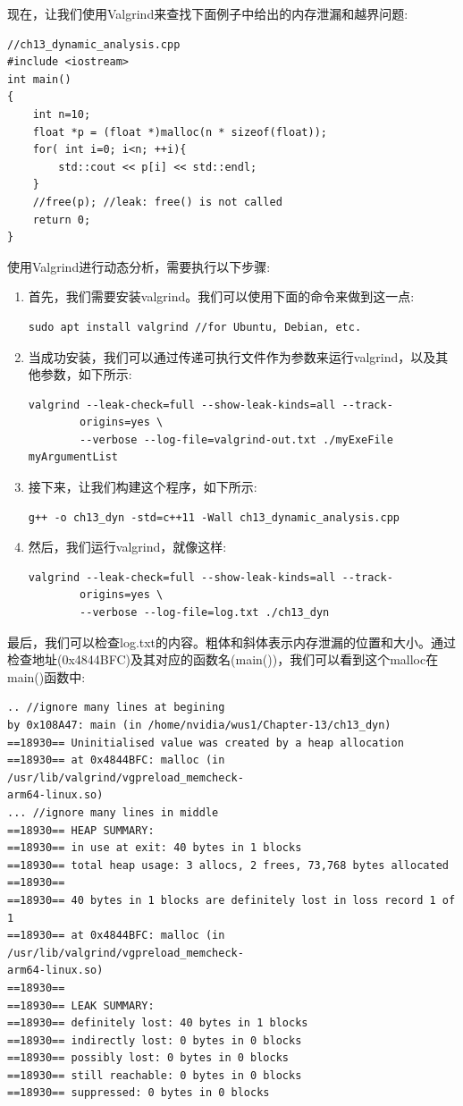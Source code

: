 现在，让我们使用Valgrind来查找下面例子中给出的内存泄漏和越界问题: \par

\begin{lstlisting}[caption={}]
//ch13_dynamic_analysis.cpp
#include <iostream>
int main()
{
	int n=10;
	float *p = (float *)malloc(n * sizeof(float));
	for( int i=0; i<n; ++i){
		std::cout << p[i] << std::endl;
	}
	//free(p); //leak: free() is not called
	return 0;
}
\end{lstlisting}

使用Valgrind进行动态分析，需要执行以下步骤:
\begin{enumerate}
	\item 首先，我们需要安装valgrind。我们可以使用下面的命令来做到这一点:
	\begin{lstlisting}[caption={}]
		sudo apt install valgrind //for Ubuntu, Debian, etc.
	\end{lstlisting}
	\item 当成功安装，我们可以通过传递可执行文件作为参数来运行valgrind，以及其他参数，如下所示:
	\begin{lstlisting}[caption={}]
		valgrind --leak-check=full --show-leak-kinds=all --track-
		origins=yes \
		--verbose --log-file=valgrind-out.txt ./myExeFile myArgumentList
	\end{lstlisting}
	\item 接下来，让我们构建这个程序，如下所示:
	\begin{lstlisting}[caption={}]
		g++ -o ch13_dyn -std=c++11 -Wall ch13_dynamic_analysis.cpp
	\end{lstlisting}
	\item 然后，我们运行valgrind，就像这样:
	\begin{lstlisting}[caption={}]
		valgrind --leak-check=full --show-leak-kinds=all --track-
		origins=yes \
		--verbose --log-file=log.txt ./ch13_dyn
	\end{lstlisting}
\end{enumerate}

最后，我们可以检查log.txt的内容。粗体和斜体表示内存泄漏的位置和大小。通过检查地址(0x4844BFC)及其对应的函数名(main())，我们可以看到这个malloc在main()函数中: \par
\begin{lstlisting}[caption={}]
.. //ignore many lines at begining
by 0x108A47: main (in /home/nvidia/wus1/Chapter-13/ch13_dyn)
==18930== Uninitialised value was created by a heap allocation
==18930== at 0x4844BFC: malloc (in /usr/lib/valgrind/vgpreload_memcheck-
arm64-linux.so)
... //ignore many lines in middle
==18930== HEAP SUMMARY:
==18930== in use at exit: 40 bytes in 1 blocks
==18930== total heap usage: 3 allocs, 2 frees, 73,768 bytes allocated
==18930==
==18930== 40 bytes in 1 blocks are definitely lost in loss record 1 of 1
==18930== at 0x4844BFC: malloc (in /usr/lib/valgrind/vgpreload_memcheck-
arm64-linux.so)
==18930==
==18930== LEAK SUMMARY:
==18930== definitely lost: 40 bytes in 1 blocks
==18930== indirectly lost: 0 bytes in 0 blocks
==18930== possibly lost: 0 bytes in 0 blocks
==18930== still reachable: 0 bytes in 0 blocks
==18930== suppressed: 0 bytes in 0 blocks
\end{lstlisting}

